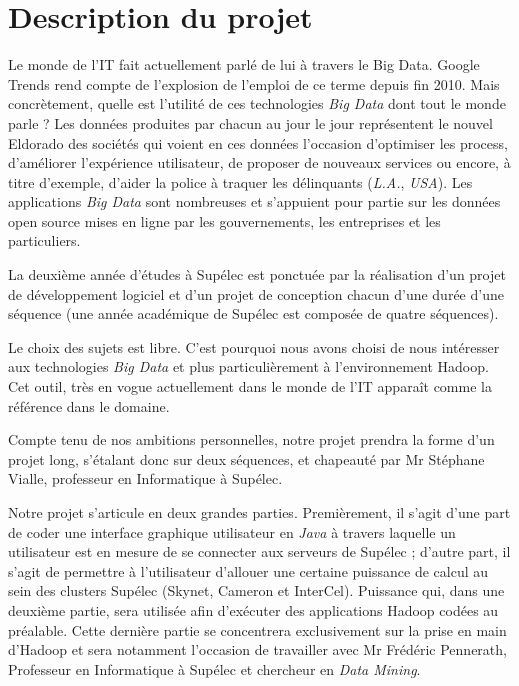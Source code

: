 \section{Description du projet}

\par Le monde de l'IT fait actuellement parlé de lui à travers le Big Data. Google Trends rend compte de l'explosion de l'emploi de ce terme depuis fin 2010. Mais concrètement, quelle est l'utilité de ces technologies \emph{Big Data} dont tout le monde parle ? Les données produites par chacun au jour le jour représentent le nouvel Eldorado des sociétés qui voient en ces données l'occasion d'optimiser les process, d'améliorer l'expérience utilisateur, de proposer de nouveaux services ou encore, à titre d'exemple, d'aider la police à traquer les délinquants (\emph{L.A.}, \emph{USA}). Les applications \emph{Big Data} sont nombreuses et s'appuient pour partie sur les données open source mises en ligne par les gouvernements, les entreprises et les particuliers.

\par La deuxième année d'études à Supélec est ponctuée par la réalisation d'un projet de développement logiciel et d'un projet de conception chacun d'une durée d'une séquence (une année académique de Supélec est composée de quatre séquences).

\par Le choix des sujets est libre. C'est pourquoi nous avons choisi de nous intéresser aux technologies \emph{Big Data} et plus particulièrement à l'environnement Hadoop. Cet outil, très en vogue actuellement dans le monde de l'IT apparaît comme la référence dans le domaine.

\par Compte tenu de nos ambitions personnelles, notre projet prendra la forme d'un projet long, s'étalant donc sur deux séquences, et chapeauté par Mr Stéphane Vialle, professeur en Informatique à Supélec.

\par Notre projet s'articule en deux grandes parties. Premièrement, il s'agit d'une part de coder une interface graphique utilisateur en \emph{Java} à travers laquelle un utilisateur est en mesure de se connecter aux serveurs de Supélec ; d'autre part, il s'agit de permettre à l'utilisateur d'allouer une certaine puissance de calcul au sein des clusters Supélec (Skynet, Cameron et InterCel). Puissance qui, dans une deuxième partie, sera utilisée afin d'exécuter des applications Hadoop codées au préalable. Cette dernière partie se concentrera exclusivement sur la prise en main d'Hadoop et sera notamment l'occasion de travailler avec Mr Frédéric Pennerath, Professeur en Informatique à Supélec et chercheur en \emph{Data Mining}.


